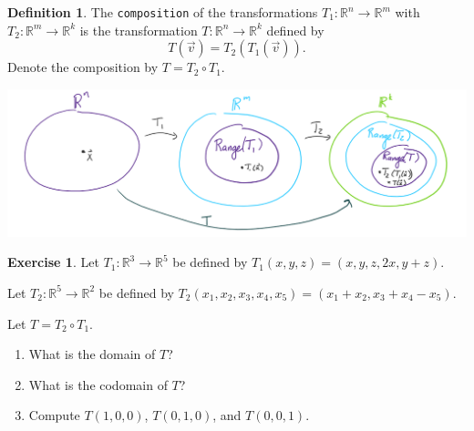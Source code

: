 \documentclass{beamer}
\newcommand{\R}{\mathbb{R}}
\newcommand{\fn}{\insertframenumber}
\theoremstyle{definition}
\newtheorem{exercise}{Exercise}
\newtheorem*{defn}{Definition}
\renewcommand{\emph}[1]{{\color{blue}\texttt{#1}}}
\begin{document}
\begin{frame}{\fn}
	\begin{defn}
		The \emph{composition} of the transformations $T_1\colon \R^n\to \R^m$ with $T_2\colon \R^m\to\R^k$ is the transformation $T\colon \R^n\to\R^k$ defined by 
			\[T(\vec v)=T_2(T_1(\vec v)).\]
		Denote the composition by $T=T_2\circ T_1$.
		\begin{center}
			\includegraphics[width=.9\textwidth]{../images/composition}
		\end{center}
	\end{defn}
\end{frame}
\begin{frame}{\fn}
	\begin{exercise}
		Let $T_1:\R^3\to\R^5$  be defined by $T_1(x,y,z)=(x,y,z,2x,y+z)$.
		
		Let $T_2:\R^5\to\R^2$ be defined by $T_2(x_1,x_2,x_3,x_4,x_5)=(x_1+x_2,x_3+x_4-x_5)$.
		
		Let $T=T_2\circ T_1$.  
		\begin{enumerate}[label=(\alph*)]
			\item What is the domain of $T$?  
			\item What is the codomain of $T$?
			\item Compute $T(1,0,0)$, $T(0,1,0)$, and $T(0,0,1)$.
		\end{enumerate}
	\end{exercise}
\end{frame}
\end{document}
